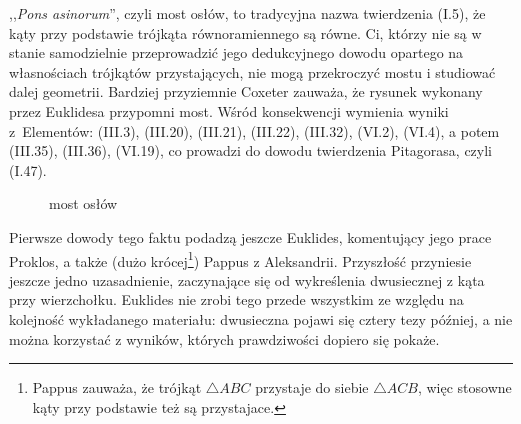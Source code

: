 %

,,\emph{Pons asinorum}'', czyli most osłów, to tradycyjna nazwa twierdzenia (I.5), że kąty przy podstawie trójkąta równoramiennego są równe.
Ci, którzy nie są w stanie samodzielnie przeprowadzić jego dedukcyjnego dowodu opartego na własnościach trójkątów przystających, nie mogą przekroczyć mostu i studiować dalej geometrii.
Bardziej przyziemnie Coxeter \cite[s. 6-9]{coxeter_1991} zauważa, że rysunek wykonany przez Euklidesa przypomni most.
Wśród konsekwencji wymienia wyniki z~Elementów: (III.3), (III.20), (III.21), (III.22), (III.32), (VI.2), (VI.4), a potem (III.35), (III.36), (VI.19), co prowadzi do dowodu twierdzenia Pitagorasa, czyli (I.47). %
%

\begin{figure}[H] \centering
\begin{comment}
\begin{tikzpicture}[scale=.5]
    \tkzDefPoint(90:-1){A}
    \tkzDefPoint(-55:5){C}
    \tkzDefPoint(235:5){B}
    \tkzDefPoint(-90:8){X}

    \tkzLabelPoint[above](A){$A$}
    \tkzLabelPoint[left](B){$B$}
    \tkzLabelPoint[right](C){$C$}
    \tkzInterLC(A,B)(A,X) \tkzGetPoints{XX}{D} %
    \tkzLabelPoint[left](D){$D$}
    \tkzDefLine[parallel=through D](B,C) \tkzGetPoint{XXX}
    \tkzInterLL(D,XXX)(A,C) \tkzGetPoint{E} %
    \tkzLabelPoint[right](E){$E$}
    
    \tkzMarkSegments[mark=|](A,B A,C)
    \tkzMarkSegments[mark=||](B,D C,E)
    \tkzDrawLines[add= 0 and 0, line width=0.2mm](B,E C,D)
    \tkzDrawLines[add= 0 and 0.5, line width=0.2mm](B,D C,E)
    \tkzDrawPolygon[line width=0.5mm](A,B,C)
    \tkzDrawPoints[size=4,color=black,fill=black!50](A,B,C,D,E)
\end{tikzpicture}
\end{comment}
    \caption{most osłów}
\end{figure}

Pierwsze dowody tego faktu podadzą jeszcze Euklides, komentujący jego prace Proklos, a także (dużo krócej\footnote{Pappus zauważa, że trójkąt $\triangle ABC$ przystaje do siebie $\triangle ACB$, więc stosowne kąty przy podstawie też są przystajace.}) Pappus z Aleksandrii.
%
%
Przyszłość przyniesie jeszcze jedno uzasadnienie, zaczynające się od wykreślenia dwusiecznej z kąta przy wierzchołku.
%
Euklides nie zrobi tego przede wszystkim ze względu na kolejność wykładanego materiału: dwusieczna pojawi się cztery tezy później, a nie można korzystać z wyników, których prawdziwości dopiero się pokaże.


